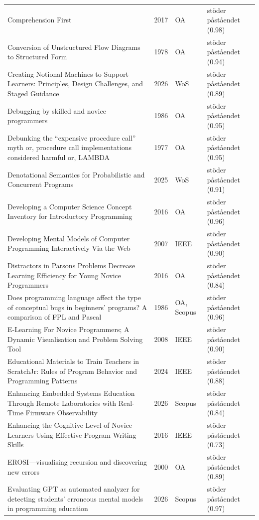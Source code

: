 \begin{longtable}{@{}%
  >{\raggedright\arraybackslash}p{}c%
  >{\raggedright\arraybackslash}p{}%
  >{\raggedright\arraybackslash}p{}@{}}
Comprehension First & 2017 & OA & stöder påståendet (0.98) \\
Conversion of Unstructured Flow Diagrams to Structured Form & 1978 & OA & stöder påståendet (0.94) \\
Creating Notional Machines to Support Learners: Principles, Design Challenges, and Staged Guidance & 2026 & WoS & stöder påståendet (0.89) \\
Debugging by skilled and novice programmers & 1986 & OA & stöder påståendet (0.95) \\
Debunking the ``expensive procedure call'' myth or, procedure call implementations considered harmful or, LAMBDA & 1977 & OA & stöder påståendet (0.95) \\
Denotational Semantics for Probabilistic and Concurrent Programs & 2025 & WoS & stöder påståendet (0.91) \\
Developing a Computer Science Concept Inventory for Introductory Programming & 2016 & OA & stöder påståendet (0.96) \\
Developing Mental Models of Computer Programming Interactively Via the Web & 2007 & IEEE & stöder påståendet (0.90) \\
Distractors in Parsons Problems Decrease Learning Efficiency for Young Novice Programmers & 2016 & OA & stöder påståendet (0.84) \\
Does programming language affect the type of conceptual bugs in beginners' programs? A comparison of FPL and Pascal & 1986 & OA, Scopus & stöder påståendet (0.96) \\
E-Learning For Novice Programmers; A Dynamic Visualisation and Problem Solving Tool & 2008 & IEEE & stöder påståendet (0.90) \\
Educational Materials to Train Teachers in ScratchJr: Rules of Program Behavior and Programming Patterns & 2024 & IEEE & stöder påståendet (0.88) \\
Enhancing Embedded Systems Education Through Remote Laboratories with Real-Time Firmware Observability & 2026 & Scopus & stöder påståendet (0.84) \\
Enhancing the Cognitive Level of Novice Learners Using Effective Program Writing Skills & 2016 & IEEE & stöder påståendet (0.73) \\
EROSI---visualising recursion and discovering new errors & 2000 & OA & stöder påståendet (0.89) \\
Evaluating GPT as automated analyzer for detecting students' erroneous mental models in programming education & 2026 & Scopus & stöder påståendet (0.97) \\

\end{longtable}
